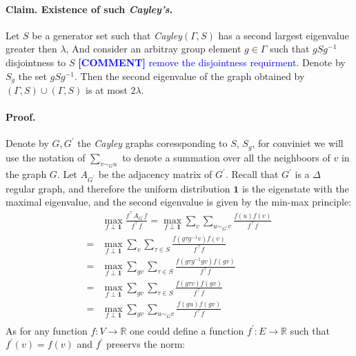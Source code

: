\documentclass{article}
\newcommand{\commentt}[1]{\textcolor{blue}{ \textbf{[COMMENT]} #1}}
\newcommand{\ctt}[1]{\commentt{#1}}
\begin{document}
\begin{multicols*}{2}
  \paragraph{Claim. Existence of such \emph{Cayley's}.} Let $S$ be a generator set such that \emph{Cayley}$\left( \Gamma , S \right)$ has a second largest eigenvalue greater then $\lambda$, And consider an arbitray group element $g \in \Gamma$ such that $gSg^{-1}$ disjointness to $S$ \ctt{ remove the disjointness requirment}. Denote by $S_{g}$ the set $gSg^{-1}$. Then the second eigenvalue of the graph obtained by $\left( \Gamma, S \right) \cup \left( \Gamma, S \right)$ is at most $2\lambda$. 
  \paragraph{Proof.} Denote by $G,G^{\prime}$ the \emph{Cayley} graphs coressponding to $S$, $S_{g}$, for conviniet we will use the notation of $\sum_{v\sim_{G} u}$ to denote a summation over all the neighboors of $v$ in the graph $G$. Let $A_{G^{\prime}}$ be the adjacency matrix of $G^{\prime}$. Recall that $G^{\prime}$ is a  $\Delta$ regular graph, and therefore the uniform distribution $\mathbf{1}$ is the eigenstate with the maximal eigenvalue, and the second eigenvalue is given by the min-max principle: 
  \begin{equation*}
    \begin{split}
      & \max_{f \perp \mathbf{1}} { \frac{f^{\top}A_{G^{\prime}} f  }{ f^{\top}f}} = \max_{f \perp \mathbf{1}} { \sum_{v}  \sum_{u\sim_{G^{\prime}} v}\frac{f\left( u \right) f \left( v \right)  }{ f^{\top}f}} \\
      =  & \max_{f \perp \mathbf{1}} { \sum_{v}\sum_{\tau \in S} \frac{f\left( g\tau g^{-1} v \right) f \left( v \right)  }{ f^{\top}f}} \\ = & \max_{f \perp \mathbf{1}} { \sum_{gv} \sum_{\tau \in S}\frac{f\left( g\tau g^{-1} gv \right) f \left( gv \right)  }{ f^{\top}f}} \\  
      = & \max_{f \perp \mathbf{1}} { \sum_{gv}\sum_{\tau \in S}\frac{f\left( g \tau v \right) f \left( g v \right)  }{ f^{\top}f}} \\  = & \max_{f \perp \mathbf{1}} { \sum_{gv}\sum_{ u\sim_{G} v }\frac{f\left( gu \right) f \left( gv \right)  }{ f^{\top}f}} \\
         \end{split}
  \end{equation*}
  As for any function $f : V \rightarrow \mathbb{R} $ one could define a function $f^{\prime} : E \rightarrow \mathbb{R} $ such that $f^{\prime}\left( v \right) = f\left( v \right) $ and $f^{\prime}$ preservs the norm:    

\end{multicols*}
\end{document}
